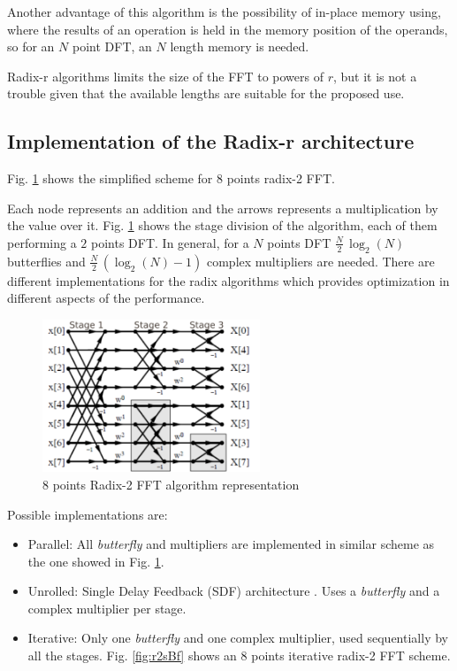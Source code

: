 \documentclass[conference]{IEEEtran}
\begin{document}
Another advantage of this algorithm is the possibility of in-place memory using, where the results of an operation
is held in the memory position of the operands, so for an $N$ point DFT, an $N$ length memory is needed.

Radix-r algorithms limits the size of the FFT to powers of $r$, but it is not a trouble given that the available lengths are suitable for the proposed use.

\subsection{Implementation of the Radix-r architecture}

Fig. \ref{fig:r2_8} shows the simplified scheme for $8$ points radix-2 FFT.

Each node represents an addition and the arrows represents a multiplication by the value over it. 
Fig. \ref{fig:r2_8} shows the stage division of the algorithm, each of them performing a $2$ points DFT.
In general, for a $N$ points DFT $\frac{N}{2} \, \log_2(N)$ butterflies and $\frac{N}{2} \, (\log_2(N)-1)$ complex multipliers
are needed. There are different implementations for the radix algorithms which provides optimization in 
different aspects of the performance.

\begin{figure}[htb!]
        \centering
        \includegraphics[width=6.5cm]{./figures/r2_8.png}
        \caption{8 points Radix-2 FFT algorithm representation}
        \label{fig:r2_8}
\end{figure}

Possible implementations are:

\begin{itemize}
  \item Parallel: All \textit{butterfly} and multipliers are implemented in similar scheme as 
  the one showed in Fig. \ref{fig:r2_8}.
  \item Unrolled: Single Delay Feedback (SDF) architecture \cite{torkelson}. Uses a \textit{butterfly} and a complex multiplier per stage.
  \item Iterative: Only one \textit{butterfly} and one complex multiplier, used sequentially
  by all the stages. Fig. \ref{fig:r2sBf} shows an $8$ points iterative radix-2 FFT scheme. 
\end{itemize}
\end{document}
